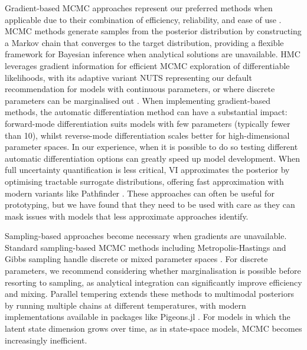 \documentclass{article}
\begin{document}
Gradient-based \ac{MCMC} approaches represent our preferred methods when applicable due to their combination of efficiency, reliability, and ease of use \citep{gilks1995markov, lekone2006statistical}.
MCMC methods generate samples from the posterior distribution by constructing a Markov chain that converges to the target distribution, providing a flexible framework for Bayesian inference when analytical solutions are unavailable.
\ac{HMC} leverages gradient information for efficient MCMC exploration of differentiable likelihoods, with its adaptive variant \ac{NUTS} representing our default recommendation for models with continuous parameters, or where discrete parameters can be marginalised out \citep{duane1987hybrid, hoffman2014no, andrade2020evaluation}.
When implementing gradient-based methods, the automatic differentiation method can have a substantial impact: forward-mode differentiation suits models with few parameters (typically fewer than 10), whilst reverse-mode differentiation scales better for high-dimensional parameter spaces.
In our experience, when it is possible to  do so testing different automatic differentiation options can greatly speed up model development.
When full uncertainty quantification is less critical, \ac{VI} approximates the posterior by optimising tractable surrogate distributions, offering fast approximation with modern variants like Pathfinder \citep{blei2017variational, chatzilena2019contemporary}.
These approaches can often be useful for prototyping, but we have found that they need to be used with care as they can mask issues with models that less approximate approaches identify.

Sampling-based approaches become necessary when gradients are unavailable.
Standard sampling-based MCMC methods including Metropolis-Hastings and Gibbs sampling handle discrete or mixed parameter spaces \citep{hastings1970monte, geman1984stochastic, gilks1995markov}.
For discrete parameters, we recommend considering whether marginalisation is possible before resorting to sampling, as analytical integration can significantly improve efficiency and mixing.
Parallel tempering extends these methods to multimodal posteriors by running multiple chains at different temperatures, with modern implementations available in packages like Pigeons.jl \citep{surjanovic2023pigeons}.
For models in which the latent state dimension grows over time, as in state-space models, MCMC becomes increasingly inefficient.
\end{document}
